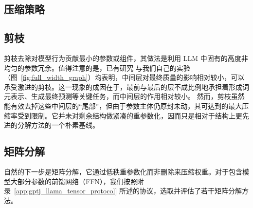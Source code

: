 \documentclass[11pt]{article}
\begin{document}
\begin{mainpart}
\section{压缩策略}
\label{sec:compression}

\subsection{剪枝}

剪枝去除对模型行为贡献最小的参数或组件，其做法是利用 LLM 中固有的高度非均匀的参数冗余。值得注意的是，已有研究 \citep{unreasonable_ineffectiveness_2024} 与我们自己的实验（图~\ref{fig:full_width_graph}）均表明，中间层对最终质量的影响相对较小，可以承受激进的剪枝。这一现象的成因在于，最前与最后的层不成比例地承担着形成词元表示、生成最终预测等关键任务，而中间层的作用相对较小。
然而，剪枝虽然能有效去掉这些中间层的“尾部”，但由于参数主体仍原封未动，其可达到的最大压缩率受到限制。它并未对剩余结构做紧凑的重参数化，因而只是相对于结构上更先进的分解方法的一个朴素基线。




\subsection{矩阵分解}


自然的下一步是矩阵分解，它通过低秩重参数化而非删除来压缩权重。对于包含模型大部分参数的前馈网络（FFN）\citep{FFNs_Are_Memory_2021}，我们按照附录~\ref{app:gptj_llama_tensor_protocol} 所述的协议，选取并评估了若干矩阵分解方法。



\end{mainpart}
\end{document}
